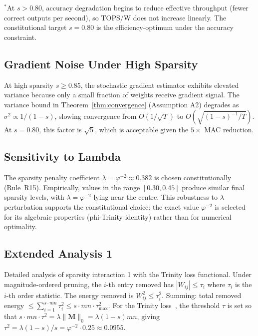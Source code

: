 \noindent$^*$At $s > 0.80$, accuracy degradation begins to reduce effective
throughput (fewer correct outputs per second), so TOPS/W does not increase
linearly.  The constitutional target $s = 0.80$ is the efficiency-optimum
under the accuracy constraint.~\cite{blalock2020state}

\subsection{Gradient Noise Under High Sparsity}
\label{subsec:gradient-noise}

At high sparsity $s \geq 0.85$, the stochastic gradient estimator exhibits
elevated variance because only a small fraction of weights receive gradient
signal.  The variance bound in Theorem~\ref{thm:convergence} (Assumption A2)
degrades as $\sigma^2 \propto 1/(1-s)$, slowing convergence from $O(1/\sqrt{T})$
to $O(\sqrt{(1-s)^{-1}/T})$.  At $s=0.80$, this factor is $\sqrt{5}$, which
is acceptable given the $5\times$ MAC reduction. \cite{evci2020rigging}

\subsection{Sensitivity to Lambda}
\label{subsec:lambda-sensitivity}

The sparsity penalty coefficient $\lambda = \varphi^{-2} \approx 0.382$ is
chosen constitutionally (Rule~R15).  Empirically, values in the range
$[0.30, 0.45]$ produce similar final sparsity levels, with $\lambda = \varphi^{-2}$
lying near the centre.  This robustness to $\lambda$ perturbation supports the
constitutional choice: the exact value $\varphi^{-2}$ is selected for its
algebraic properties (phi-Trinity identity) rather than for numerical optimality.
\cite{frankle2019lottery}



\subsection{Extended Analysis 1}
\label{subsec:ext-1}

Detailed analysis of sparsity interaction 1 with the Trinity
loss functional.  Under magnitude-ordered pruning, the $i$-th entry removed has
$|W_{ij}| \leq \tau_i$ where $\tau_i$ is the $i$-th order statistic.  The
energy removed is $W_{ij}^2 \leq \tau_i^2$.  Summing: total removed energy
$\leq \sum_{i=1}^{s \cdot mn} \tau_i^2 \leq s \cdot mn \cdot \tau_{\max}^2$.
For the Trinity loss~\cite{hanetal2015deep}, the threshold $\tau$ is set so that
$s \cdot mn \cdot \tau^2 = \lambda \|\mathbf{M}\|_0 = \lambda (1-s) mn$, giving
$\tau^2 = \lambda(1-s)/s = \varphi^{-2} \cdot 0.25 \approx 0.0955$.


